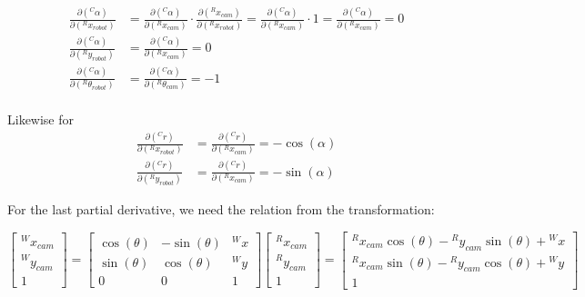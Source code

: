 \documentclass{article}
\begin{document}
\begin{enumerate}[label=(\roman*)]
\begin{equation}
\begin{aligned}
\frac{\partial ({}^C\alpha)}{\partial ({}^R x_{robot})}
&= \frac{\partial ({}^C\alpha)}{\partial ({}^R x_{cam})} \cdot
\frac{\partial ({}^R x_{cam})}{\partial ({}^R x_{robot})}
=\frac{\partial ({}^C\alpha)}{\partial ({}^R x_{cam})} \cdot 1
=
\frac{\partial ({}^C\alpha)}{\partial ({}^R x_{cam})} = 0 \\
\frac{\partial ({}^C\alpha)}{\partial ({}^R y_{robot})} &= \frac{\partial ({}^C\alpha)}{\partial ({}^R x_{cam})} = 0 \\
\frac{\partial ({}^C\alpha)}{\partial ({}^R \theta_{robot})} &= \frac{\partial ({}^C\alpha)}{\partial ({}^R \theta_{cam})} = -1 \\
\end{aligned}
\end{equation}

Likewise for 
\begin{equation}
\begin{aligned}
\frac{\partial ({}^C r)}{\partial ({}^R x_{robot})} &= \frac{\partial ({}^C r)}{\partial ({}^R x_{cam})} = -\cos(\alpha) \\
\frac{\partial ({}^C r)}{\partial ({}^R y_{robot})} &= \frac{\partial ({}^C r)}{\partial ({}^R x_{cam})} = -\sin(\alpha)
\end{aligned}
\end{equation}

For the last partial derivative, we need the relation from the transformation:

\begin{equation}
\begin{bmatrix}
{}^W x_{cam} \\ {}^W y_{cam} \\ 1
\end{bmatrix}
=
\begin{bmatrix}
\cos(\theta) & -\sin(\theta) & {}^W x \\
\sin(\theta) & \cos(\theta) & {}^W y \\
0 & 0 & 1
\end{bmatrix}
\begin{bmatrix}
{}^R x_{cam} \\ {}^R y_{cam} \\ 1
\end{bmatrix}
=
\begin{bmatrix}
{}^R x_{cam} \cos(\theta) - {}^R y_{cam} \sin(\theta) + {}^W x \\
{}^R x_{cam} \sin(\theta) - {}^R y_{cam} \cos(\theta) + {}^W y \\
1
\end{bmatrix}
\end{equation}


\end{enumerate}
\end{document}
